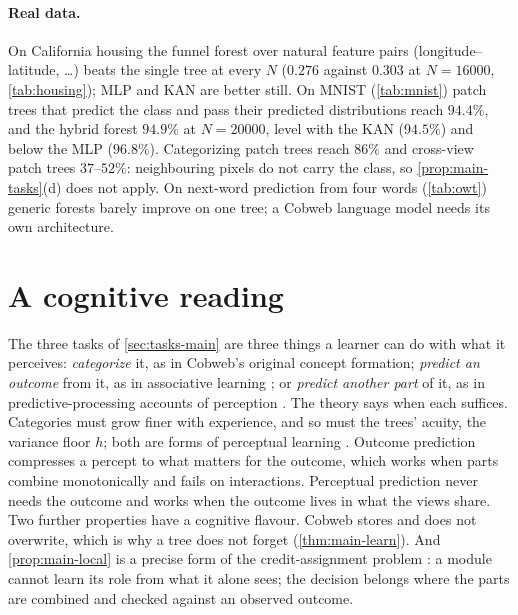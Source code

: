 \documentclass[11pt]{article}
\theoremstyle{definition}
\theoremstyle{remark}
\begin{document}
\begin{table}[t]
\centering\small

\caption{MNIST accuracy (\%, three seeds); one tree per $7\times7$ patch.  ``label'': patch
trees categorize (Convolutional Cobweb); ``cross'': they predict the centre pixels of the
neighbouring patches; ``act'': they predict the class and pass its distribution;
``hybrid'': ``act'' plus labels.}
\label{tab:mnist}
\end{table}

\paragraph{Real data.}
On California housing the funnel forest over natural feature pairs
(longitude--latitude, \dots) beats the single tree at every $N$ ($0.276$ against $0.303$
at $N=16000$, \cref{tab:housing}); MLP and KAN are better still.  On MNIST
(\cref{tab:mnist}) patch trees that predict the class and pass their predicted
distributions reach $94.4\%$, and the hybrid forest $94.9\%$ at $N=20000$, level with the
KAN ($94.5\%$) and below the MLP ($96.8\%$).  Categorizing patch trees reach $86\%$ and
cross-view patch trees $37$--$52\%$: neighbouring pixels do not carry the class, so
\cref{prop:main-tasks}(d) does not apply.  On next-word prediction from four words
(\cref{tab:owt}) generic forests barely improve on one tree; a Cobweb language model
needs its own architecture.

\section{A cognitive reading}\label{sec:cog}

The three tasks of \cref{sec:tasks-main} are three things a learner can do with what it
perceives: \emph{categorize} it, as in Cobweb's original concept formation;
\emph{predict an outcome} from it, as in associative learning \citep{rescorla1972}; or
\emph{predict another part} of it, as in predictive-processing accounts of perception
\citep{clark2013}.  The theory says when each suffices.  Categories must grow finer with
experience, and so must the trees' acuity, the variance floor $h$; both are forms of
perceptual learning \citep{goldstone1998}.  Outcome prediction compresses a percept to what
matters for the outcome, which works when parts combine monotonically and fails on
interactions.  Perceptual prediction never needs the outcome and works when the outcome
lives in what the views share.  Two further properties have a cognitive flavour.  Cobweb
stores and does not overwrite, which is why a tree does not forget
(\cref{thm:main-learn}).  And \cref{prop:main-local} is a precise form of the
credit-assignment problem \citep{minsky1961}: a module cannot learn its role from what it
alone sees; the decision belongs where the parts are combined and checked against an
observed outcome.
\end{document}

